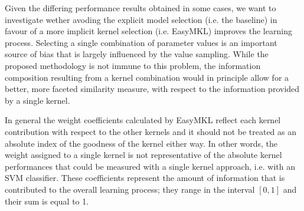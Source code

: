 
Given the differing performance results obtained in some cases, we want to investigate wether
avoding the explicit model selection (i.e. the baseline) in favour of a
more implicit kernel selection (i.e. EasyMKL) improves the learning process.
Selecting a single combination of parameter values is an important source of bias that
is largely influenced by the value sampling.
While the proposed methodology is not immune to this problem, the information composition
resulting from a kernel combination would in principle allow for a better, more faceted
similarity measure, with respect to the information provided by a single kernel.

In general the weight coefficients calculated by EasyMKL reflect each kernel
contribution with respect to the other kernels and it should not
be treated as an absolute index of the goodness of the kernel either way.
In other words, the weight assigned to a single kernel is not representative of the
absolute kernel performances that could be measured with a single kernel approach, i.e. with
an SVM classifier.
These coefficients represent the amount of information that is contributed to the overall learning
process; they range in the interval $[0,1]$ and their sum is equal to 1.


